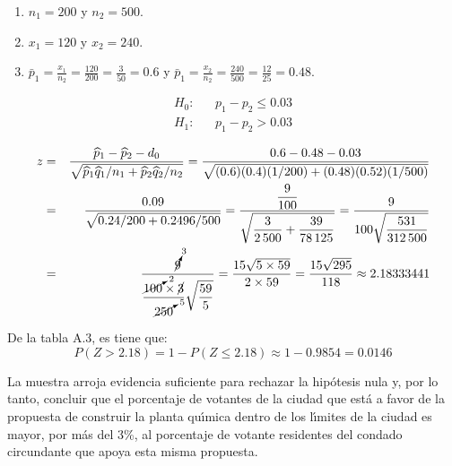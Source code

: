 \begin{solucion}
 \begin{datos}
  $\phantom{0}$
  \begin{enumerate}
   \item $n_1 = 200$ y $n_2 = 500$.
   \item $x_1 = 120$ y $x_2 = 240$.
   \item $\bar{p}_1 = \frac{x_1}{n_2} = \frac{120}{200}=\frac{3}{50} = 0.6$
   y $\bar{p}_1 = \frac{x_2}{n_2}=\frac{240}{500} = \frac{12}{25} = 0.48$.
  \end{enumerate}
 \end{datos}

 \begin{hipotesis}
  \begin{eqnarray*}
   H_0: & & p_1 - p_2 \leq 0.03 \\
   H_1: & & p_1 - p_2   >  0.03
  \end{eqnarray*}
 \end{hipotesis}

 \begin{estadistico}
  \begin{eqnarray*}
   z & = & \frac{\widehat{p}_1-\widehat{p}_2-d_0}{\sqrt{
  \widehat{p}_1\widehat{q}_1/n_1 + \widehat{p}_2\widehat{q}_2/n_2}}
  = \frac{0.6 - 0.48 - 0.03}{\sqrt{
  (0.6)(0.4)(1/200) + (0.48)(0.52)(1/500)}} \\
  & = & \frac{0.09}{\sqrt{0.24/200 + 0.2496/500}}
  = \frac{\displaystyle{\frac{9}{100}}}{\displaystyle{\sqrt{
  \frac{3}{2\,500} + \frac{39}{78\,125}}}}
  = \frac{9}{\displaystyle{100\sqrt{ 
  \frac{531}{312\,500}}}} \\
  & = & \frac{\cancelto{3}{9}}{\displaystyle{
  \frac{\cancelto{2}{100}\times \cancel{3}}{\cancelto{5}{250}}\sqrt{\frac{59}{5}}}}
  = \frac{15\sqrt{5 \times 59}}{2\times 59}
  = \frac{15\sqrt{295}}{118} \approx 2.18333441
  \end{eqnarray*}
 \end{estadistico}

 \begin{valorp}
  De la tabla A.3, es tiene que:
  \begin{equation*}
   P(Z > 2.18) = 1 - P(Z \leq 2.18) \approx 1 - 0.9854 = 0.0146
  \end{equation*}
 \end{valorp}

 \begin{conclusion}
  La muestra arroja evidencia suficiente para rechazar la hip\'otesis nula
  y, por lo tanto, concluir
  que el porcentaje de votantes de la ciudad que est\'a a favor
  de la propuesta de construir la planta qu\'{\i}mica
  dentro de los l\'{\i}mites de la ciudad es mayor, por m\'as del 3\%,
  al porcentaje de votante residentes del condado circundante
  que apoya esta misma propuesta.
 \end{conclusion}


\end{solucion}
